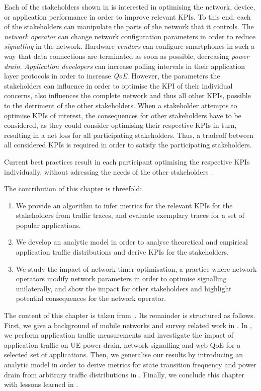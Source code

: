 Each of the stakeholders shown in  is interested in optimising the network, device, or application performance in order to improve relevant \glspl{KPI}.
To this end, each of the stakeholders can manipulate the parts of the network that it controls.
The \emph{network operator} can change network configuration parameters in order to reduce \emph{signalling} in the network.
Hardware \emph{vendors} can configure smartphones in such a way that data connections are terminated as soon as possible, decreasing \emph{power drain}.
\emph{Application developers} can increase polling intervals in their application layer protocols in order to increase \emph{\gls{QoE}}.	
However, the parameters the stakeholders can influence in order to optimise the \gls{KPI} of their individual concerns, also influences the complete network and thus all other \glspl{KPI}, possible to the detriment of the other stakeholders.
When a stakeholder attempts to optimise \glspl{KPI} of interest, the consequences for other stakeholders have to be considered, as they could consider optimising their respective \glspl{KPI} in turn, resulting in a net loss for all participating stakeholders.
Thus, a tradeoff between all considered \glspl{KPI} is required in order to satisfy the participating stakeholders.

Current best practices result in each participant optimising the respective \glspl{KPI} individually, without adressing the needs of the other stakeholders~\cite{Qian2011a,NSN2011}.

The contribution of this chapter is threefold:
\begin{enumerate}
\item We provide an algorithm to infer metrics for the relevant \glspl{KPI} for the stakeholders from traffic traces, and evaluate exemplary traces for a set of popular applications.
\item We develop an analytic model in order to analyse theoretical and empirical application traffic distributions and derive \glspl{KPI} for the stakeholders.
\item We study the impact of network timer optimisation, a practice where network operators modify network parameters in order to optimise signalling unilaterally, and show the impact for other stakeholders and highlight potential consequences for the network operator.
\end{enumerate}

The content of this chapter is taken from~\cite{Schwartz2013a,Schwartz2013c}.
Its remainder is structured as follows.
First, we give a background of mobile networks and survey related work in .
In , we perform application traffic measurements and investigate the impact of application traffic on \gls{UE} power drain, network signalling and web \gls{QoE} for a selected set of applications.
Then, we generalise our results by introducing an analytic model in order to derive metrics for state transition frequency and power drain from arbitrary traffic distributions in .
Finally, we conclude this chapter with lessons learned in .





